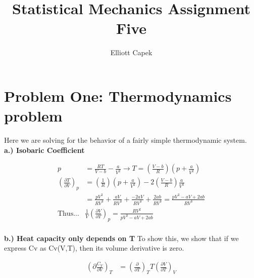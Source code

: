 \documentclass[10pt]{article} %
\title{Statistical Mechanics Assignment Five}
\author{Elliott Capek}
\begin{document}
\maketitle{}

\section{Problem One: Thermodynamics problem}
Here we are solving for the behavior of a fairly simple thermodynamic system.\\

\textbf{a.) Isobaric Coefficient}

\begin{align*}
  p &= \frac{RT}{V-b} - \frac{a}{V^2} \rightarrow T = \left(\frac{V-b}{R}\right)\left(p + \frac{a}{V^2}\right)\\
  \left(\frac{\partial T}{\partial V}\right)_p &=
  \left(\frac{1}{R}\right)\left(p + \frac{a}{V^2}\right)
  -2\left(\frac{V-b}{R}\right)\frac{a}{V^3}\\
  &= \frac{pV^3}{RV^3} + \frac{aV}{RV^3} + \frac{-2aV}{RV^3} + \frac{2ab}{RV^3}
  = \frac{pV^3 - aV + 2ab}{RV^3}\\
  \mbox{Thus...} &\frac{1}{V}\left(\frac{\partial V}{\partial T}\right)_p
  = \frac{RV^2}{pV^3 - aV + 2ab}\\
\end{align*}

\textbf{b.) Heat capacity only depends on T}
To show this, we show that if we express Cv as Cv(V,T), then its volume derivative is zero.

\begin{align*}
  \left(\partial\frac{C_V}{\partial V}\right)_T &=
  \left(\frac{\partial}{\partial T}\right)_T T\left(\frac{\partial V}{\partial T}\right)_V\\
\end{align*}
\end{document}
